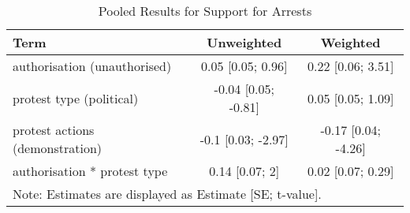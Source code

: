 \begin{table}[ht]
\centering
\begin{tabular}{lcc}
  \hline
Term & Unweighted & Weighted \\ 
  \hline
authorisation (unauthorised) & 0.05 [0.05; 0.96] & 0.22 [0.06; 3.51] \\ 
  protest type (political) & -0.04 [0.05; -0.81] & 0.05 [0.05; 1.09] \\ 
  protest actions (demonstration) & -0.1 [0.03; -2.97] & -0.17 [0.04; -4.26] \\ 
  authorisation * protest type & 0.14 [0.07; 2] & 0.02 [0.07; 0.29] \\ 
   \hline
\multicolumn{3}{l}{Note: Estimates are displayed as Estimate [SE; t-value].} \\
 \hline
\end{tabular}
\caption{Pooled Results for Support for Arrests} 
\end{table}
